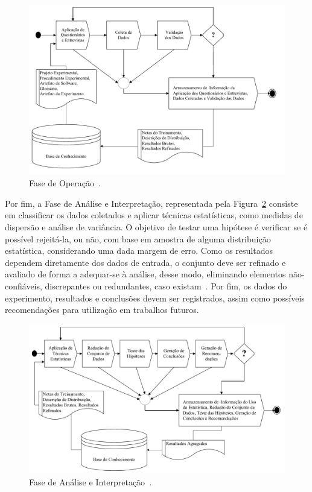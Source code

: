 \begin{figure}[!htb]
\centering
\includegraphics[width=\textwidth]{images/operacao.png}
\caption{Fase de Operação~\cite{Garcia06}.}
\label{image:operacao}
\end{figure}


Por fim, a Fase de Análise e Interpretação, representada pela Figura~\ref{image:analise} consiste em classificar os dados coletados e aplicar técnicas estatísticas, como medidas de dispersão e análise de variância. O objetivo de testar uma hipótese é verificar se é possível rejeitá-la, ou não, com base em amostra de alguma distribuição estatística, considerando uma dada margem de erro. Como os resultados dependem diretamente dos dados de entrada, o conjunto deve ser refinado e avaliado de forma a adequar-se à análise, desse modo, eliminando elementos não-confiáveis, discrepantes ou redundantes, caso existam~\cite{Garcia06}. Por fim, os dados do experimento, resultados e conclusões devem ser registrados, assim como possíveis recomendações para utilização em trabalhos futuros.

\begin{figure}[!htb]
\centering
\includegraphics[width=\textwidth]{images/analise.png}
\caption{Fase de Análise e Interpretação~\cite{Garcia06}.}
\label{image:analise}
\end{figure}

